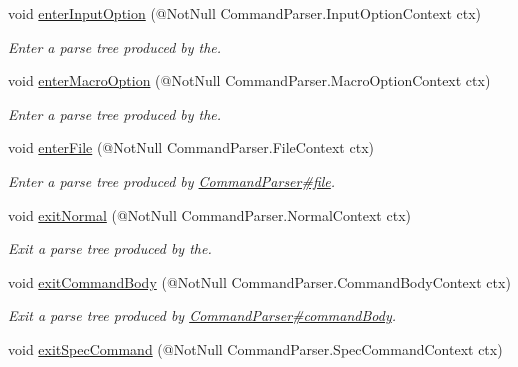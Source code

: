 \begin{DoxyCompactItemize}
void \hyperlink{classedu_1_1udel_1_1cis_1_1vsl_1_1civl_1_1run_1_1common_1_1CIVLCommandListener_ad82cff55ec042215047e89e5ec4931ef}{enter\+Input\+Option} (@Not\+Null Command\+Parser.\+Input\+Option\+Context ctx)
\begin{DoxyCompactList}\small\item\em Enter a parse tree produced by the. \end{DoxyCompactList}\item 
void \hyperlink{classedu_1_1udel_1_1cis_1_1vsl_1_1civl_1_1run_1_1common_1_1CIVLCommandListener_a381cf68530725de90fd94f64fb33132d}{enter\+Macro\+Option} (@Not\+Null Command\+Parser.\+Macro\+Option\+Context ctx)
\begin{DoxyCompactList}\small\item\em Enter a parse tree produced by the. \end{DoxyCompactList}\item 
void \hyperlink{classedu_1_1udel_1_1cis_1_1vsl_1_1civl_1_1run_1_1common_1_1CIVLCommandListener_a3a52c349e6964b0365d72891cbeda973}{enter\+File} (@Not\+Null Command\+Parser.\+File\+Context ctx)
\begin{DoxyCompactList}\small\item\em Enter a parse tree produced by \hyperlink{}{Command\+Parser\#file}. \end{DoxyCompactList}\item 
void \hyperlink{classedu_1_1udel_1_1cis_1_1vsl_1_1civl_1_1run_1_1common_1_1CIVLCommandListener_a01e4d48506b534df5897f1724e32baec}{exit\+Normal} (@Not\+Null Command\+Parser.\+Normal\+Context ctx)
\begin{DoxyCompactList}\small\item\em Exit a parse tree produced by the. \end{DoxyCompactList}\item 
void \hyperlink{classedu_1_1udel_1_1cis_1_1vsl_1_1civl_1_1run_1_1common_1_1CIVLCommandListener_a471234820f469f4cb8e118040333878e}{exit\+Command\+Body} (@Not\+Null Command\+Parser.\+Command\+Body\+Context ctx)
\begin{DoxyCompactList}\small\item\em Exit a parse tree produced by \hyperlink{}{Command\+Parser\#command\+Body}. \end{DoxyCompactList}\item 
void \hyperlink{classedu_1_1udel_1_1cis_1_1vsl_1_1civl_1_1run_1_1common_1_1CIVLCommandListener_a849f39eb7d19f8e8f154ab5925a66a6c}{exit\+Spec\+Command} (@Not\+Null Command\+Parser.\+Spec\+Command\+Context ctx)

\end{DoxyCompactItemize}
